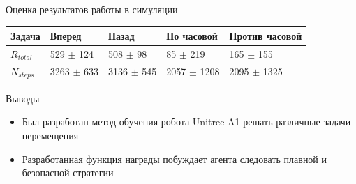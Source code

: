 \begin{frame}{Оценка результатов работы в симуляции}
\begin{table} [htbp]
\begin{threeparttable}
\begin{tabular}{| p{1cm} || p{2cm} | p{2cm} | p{2cm} |p{2cm} |}
            \hline
            \hline
            Задача & Вперед & Назад & По часовой & Против часовой \\
            \hline
            $R_{total}$ &	529 $\pm$ 124 &	508 $\pm$ 98 &	85 $\pm$ 219 &	165 $\pm$ 155 \\
            $N_{steps}$ & 3263 $\pm$ 633 &	3136 $\pm$ 545 &	2057 $\pm$ 1208 &	2095 $\pm$ 1325 \\
            \hline
            \hline
        \end{tabular}
    \end{threeparttable}
\end{table}
\end{frame}

\begin{frame}{Выводы}
\begin{itemize}
    \item Был разработан метод обучения робота Unitree A1 решать различные задачи перемещения
    \item Разработанная функция награды побуждает агента следовать плавной и безопасной стратегии
\end{itemize}
\end{frame}


